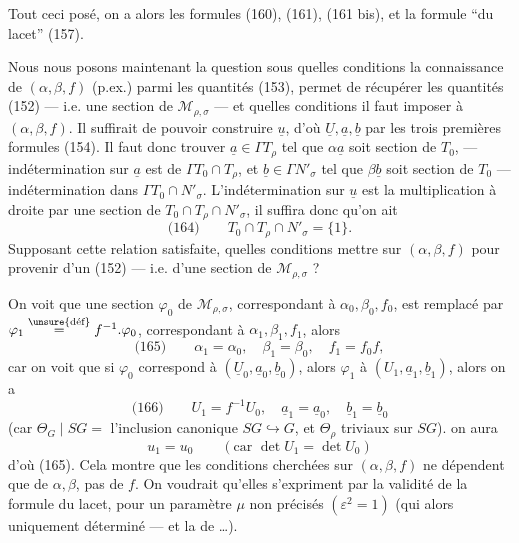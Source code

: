 
Tout ceci posé, on a alors les formules
(160), (161), (161 bis), et la formule ``du lacet'' (157).

Nous nous posons maintenant la question
sous quelles conditions la connaissance de
$(\alpha,\beta,f)$ (p.ex.) parmi les quantités (153),
permet de récupérer les quantités (152) ---
i.e. une section de $\mathcal M_{\rho,\sigma}$ --- et quelles conditions
il faut imposer à $(\alpha,\beta,f)$. Il
suffirait  de pouvoir construire $\underline u$, d'où
$\underline U,\underline a,\underline b$ par les trois premières formules
(154).  Il faut
donc trouver $\underline a\in\Gamma T_\rho$ tel que $\alpha\underline a$ soit section
de $T_0$, --- indétermination sur $\underline a$ est de
$\Gamma T_0\cap T_\rho$, et $\underline b\in\Gamma N'_\sigma$ tel que $\beta\underline b$ soit section
de $T_0$ --- indétermination dans  $\Gamma T_0\cap N'_\sigma$.
L'indétermination sur $\underline u$ est la multiplication
à droite par une section de $T_0\cap T_\rho\cap N'_\sigma$, il
suffira donc qu'on ait
\[
\text{(164)}\qquad T_0\cap T_\rho\cap N'_\sigma=\{1\}.
\]
Supposant cette relation satisfaite, quelles
conditions mettre sur $(\alpha,\beta,f)$ pour provenir
d'un  (152) --- i.e. d'une section de $\mathcal M_{\rho,\sigma}$ ?



On voit que  une section \deleted{$\unsure{\varphi}$} $\varphi_0$ de $\mathcal M_{\rho,\sigma}$, 
 correspondant à $\alpha_0,\beta_0,f_0$, est remplacé
par $\varphi_1\overset{\unsure{\text{déf}}}{=}f^{-1}.\varphi_0$, correspondant à $\alpha_1,\beta_1,f_1$, alors
\[
\text{(165)}\qquad \alpha_1=\alpha_0,\quad\beta_1=\beta_0,\quad f_1=f_0f,
\]
car on voit que si $\varphi_0$ correspond à $(\underline U_0,\underline a_0,\underline b_0)$,
alors $\varphi_1$ à $(U_1,\underline a_1,\underline b_1)$, alors on a
\[
\text{(166)}\qquad U_1=f^{-1}U_0,\quad\underline a_1=\underline a_0,\quad\underline b_1=\underline b_0
\]
(car $\Theta_G\mid SG=$ l'inclusion canonique $SG\hookrightarrow G$,
et $\Theta_\rho$\inserted{$,\Theta_\sigma$}  triviaux sur $SG$).   on aura
\[
u_1=u_0\qquad (\text{car }\det U_1=\det U_0)
\]
d'où (165). Cela montre que les conditions
cherchées sur $(\alpha,\beta,f)$ ne dépendent que de
$\alpha,\beta$, pas de $f$. On voudrait qu'elles
s'expriment par la validité de la formule du
lacet, pour un paramètre \inserted{$\varepsilon,$} $\mu$ non précisés $(\varepsilon^2=1)$
(qui  alors uniquement déterminé --- et 
la  de \ldots).

